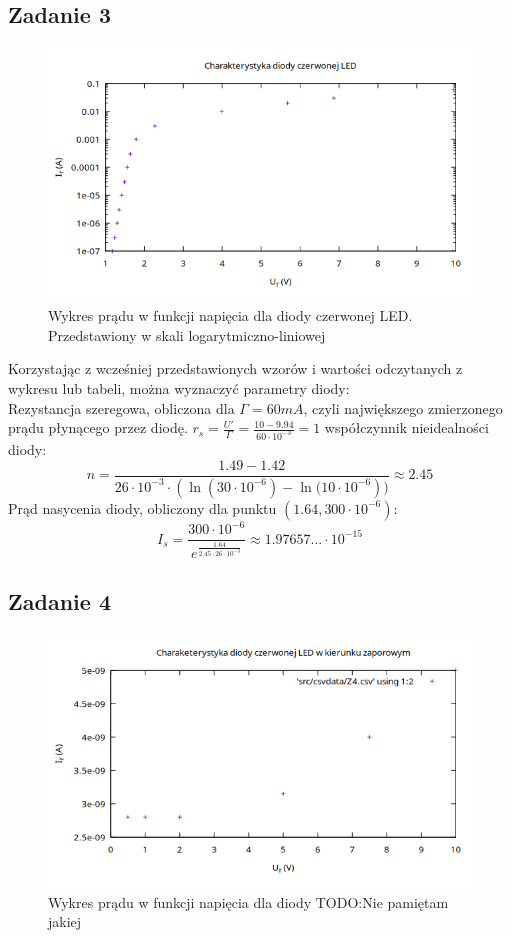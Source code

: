 \documentclass{article}
\begin{document}
\subsection{Zadanie 3}
\centering
\begin{figure}[h]
  \includegraphics[scale=0.5]{./img/Z3_U.png}
  \caption{Wykres prądu w funkcji napięcia dla diody czerwonej LED. Przedstawiony w skali logarytmiczno-liniowej}
\end{figure}
Korzystając z wcześniej przedstawionych wzorów i wartości odczytanych z wykresu lub tabeli, można wyznaczyć parametry diody: \\
Rezystancja szeregowa, obliczona dla $\Gamma=60mA$, czyli największego zmierzonego prądu płynącego przez diodę.  $r_s=\frac{U'}{\Gamma} = \frac{10-9.94}{60 \cdot 10^{-3}}=1$
współczynnik nieidealności diody: \[n = \frac{1.49-1.42}
{26 \cdot 10^{-3} \cdot (\ln{(30 \cdot 10^{-6})}-\ln{(10 \cdot 10^{-6}}))} \approx 2.45\]
Prąd nasycenia diody, obliczony dla punktu $(1.64,300\cdot10^{-6})$: \[I_s=\frac{300 \cdot 10^{-6}}{e^{\frac{1.64}{2.45 \cdot 26 \cdot 10^{-3}}}} \approx 1.97657... \cdot 10^{-15}\]

\break
\raggedright
\subsection{Zadanie 4}
\begin{figure}[h]
\centering
  \includegraphics[scale=0.5]{./img/Z4.png}
  \caption{Wykres prądu w funkcji napięcia dla diody TODO:Nie pamiętam jakiej}
\end{figure}
\end{document}
